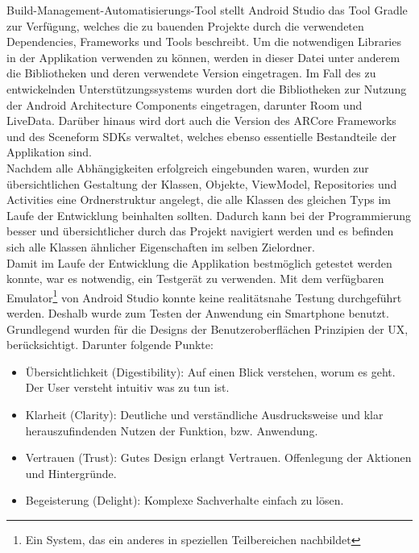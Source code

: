 Build-Management-Automatisierungs-Tool stellt Android Studio das Tool Gradle zur Verfügung, welches die zu bauenden Projekte durch die verwendeten 
Dependencies, Frameworks und Tools beschreibt. Um die notwendigen Libraries in der Applikation verwenden zu können, werden in dieser Datei unter 
anderem die Bibliotheken und deren verwendete Version eingetragen. Im Fall des zu entwickelnden Unterstützungssystems wurden dort die Bibliotheken zur 
Nutzung der Android Architecture Components eingetragen, darunter Room und LiveData. 
Darüber hinaus wird dort auch die Version des ARCore Frameworks und des Sceneform \acs{SDK}s verwaltet, welches ebenso essentielle Bestandteile der 
Applikation sind.
\\ 
Nachdem alle Abhängigkeiten erfolgreich eingebunden waren, wurden zur übersichtlichen Gestaltung der Klassen, Objekte, ViewModel, Repositories und Activities 
eine Ordnerstruktur angelegt, die alle Klassen des gleichen Typs im Laufe der Entwicklung beinhalten sollten. Dadurch kann bei der Programmierung besser und 
übersichtlicher durch das Projekt navigiert werden und  es befinden sich alle Klassen ähnlicher Eigenschaften im selben Zielordner. 
\\ 
\linebreak
Damit im Laufe der Entwicklung die Applikation bestmöglich getestet werden konnte, war es notwendig, ein Testgerät zu verwenden. Mit dem verfügbaren 
Emulator\footnote{Ein System, das ein anderes in speziellen Teilbereichen nachbildet} von Android Studio konnte keine realitätsnahe Testung 
durchgeführt werden. Deshalb wurde zum Testen der Anwendung ein Smartphone benutzt.%
\\ 
\linebreak
Grundlegend wurden für die Designs der Benutzeroberflächen Prinzipien der \ac{UX}, berücksichtigt. Darunter folgende Punkte: 
\begin{itemize}
    \item Übersichtlichkeit (Digestibility): Auf einen Blick verstehen, worum es geht. Der User versteht intuitiv was zu tun ist.
    \item Klarheit (Clarity): Deutliche und verständliche Ausdrucksweise und klar herauszufindenden Nutzen der Funktion, bzw. Anwendung.
    \item Vertrauen (Trust): Gutes Design erlangt Vertrauen. Offenlegung der Aktionen und Hintergründe. 
    \item Begeisterung (Delight): Komplexe Sachverhalte einfach zu lösen. 
\end{itemize} 
